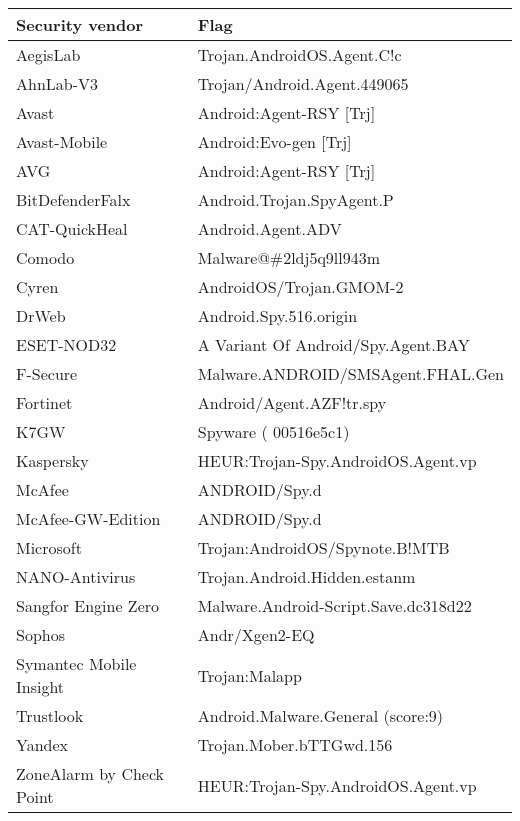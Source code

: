 \begin{tabular}{|l|l|}
    \hline
    \textbf{Security vendor} & \textbf{Flag}                        \\ \hline
    AegisLab                 & Trojan.AndroidOS.Agent.C!c           \\ \hline
    AhnLab-V3                & Trojan/Android.Agent.449065          \\ \hline
    Avast                    & Android:Agent-RSY {[}Trj{]}          \\ \hline
    Avast-Mobile             & Android:Evo-gen {[}Trj{]}            \\ \hline
    AVG                      & Android:Agent-RSY {[}Trj{]}          \\ \hline
    BitDefenderFalx          & Android.Trojan.SpyAgent.P            \\ \hline
    CAT-QuickHeal            & Android.Agent.ADV                    \\ \hline
    Comodo                   & Malware@\#2ldj5q9ll943m              \\ \hline
    Cyren                    & AndroidOS/Trojan.GMOM-2              \\ \hline
    DrWeb                    & Android.Spy.516.origin               \\ \hline
    ESET-NOD32               & A Variant Of Android/Spy.Agent.BAY   \\ \hline
    F-Secure                 & Malware.ANDROID/SMSAgent.FHAL.Gen    \\ \hline
    Fortinet                 & Android/Agent.AZF!tr.spy             \\ \hline
    K7GW                     & Spyware ( 00516e5c1)                 \\ \hline
    Kaspersky                & HEUR:Trojan-Spy.AndroidOS.Agent.vp   \\ \hline
    McAfee                   & ANDROID/Spy.d                        \\ \hline
    McAfee-GW-Edition        & ANDROID/Spy.d                        \\ \hline
    Microsoft                & Trojan:AndroidOS/Spynote.B!MTB       \\ \hline
    NANO-Antivirus           & Trojan.Android.Hidden.estanm         \\ \hline
    Sangfor Engine Zero      & Malware.Android-Script.Save.dc318d22 \\ \hline
    Sophos                   & Andr/Xgen2-EQ                        \\ \hline
    Symantec Mobile Insight  & Trojan:Malapp                        \\ \hline
    Trustlook                & Android.Malware.General (score:9)    \\ \hline
    Yandex                   & Trojan.Mober.bTTGwd.156              \\ \hline
    ZoneAlarm by Check Point & HEUR:Trojan-Spy.AndroidOS.Agent.vp   \\ \hline
\end{tabular}

